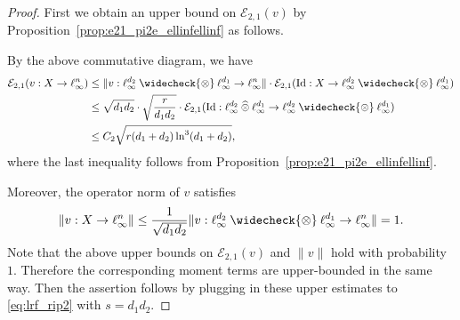 \documentclass[11pt]{article}
\begin{document}
\begin{proof}
First we obtain an upper bound on $\mathcal{E}_{2,1}(v)$ by Proposition~\ref{prop:e21_pi2e_ellinfellinf} as follows.
\begin{center}
\end{center}
By the above commutative diagram, we have
\begin{align*}
\mathcal{E}_{2,1}(v: X \to \ell_\infty^n) 
& \leq \|v: \ell_\infty^{d_2} \mathbin{\widecheck{\otimes}} \ell_\infty^{d_1} \to \ell_\infty^n\| \cdot \mathcal{E}_{2,1}(\mathrm{Id}: X \to \ell_\infty^{d_2} \mathbin{\widecheck{\otimes}} \ell_\infty^{d_1}) \\
& \leq \sqrt{d_1d_2} \cdot \sqrt{\frac{r}{d_1d_2}} \cdot  \mathcal{E}_{2,1}(\mathrm{Id}: \ell_\infty^{d_2} \mathbin{\widehat{\otimes}} \ell_\infty^{d_1} \to \ell_\infty^{d_2} \mathbin{\widecheck{\otimes}} \ell_\infty^{d_1}) \\
& \leq C_2 \sqrt{r(d_1+d_2) \ln^3(d_1+d_2)},
\end{align*}
where the last inequality follows from Proposition~\ref{prop:e21_pi2e_ellinfellinf}.

Moreover, the operator norm of $v$ satisfies
\[
\|v: X \to \ell_\infty^n\| 
\leq \frac{1}{\sqrt{d_1d_2}} \|v : \ell_\infty^{d_2} \mathbin{\widecheck{\otimes}} \ell_\infty^{d_1} \to \ell_\infty^n \| = 1.
\]
Note that the above upper bounds on $\mathcal{E}_{2,1}(v)$ and $\|v\|$ hold with probability $1$. 
Therefore the corresponding moment terms are upper-bounded in the same way. 
Then the assertion follows by plugging in these upper estimates to \eqref{eq:lrf_rip2} with $s = d_1 d_2$.
\end{proof} 
\end{document}
